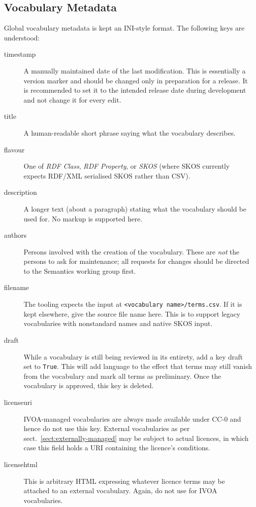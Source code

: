 \documentclass[11pt,a4paper]{ivoa}
\def\vocterm#1{\emph{\color{termcolor}#1}}
\def\vocterm{\startvocterm\realvocterm}
\def\realvocterm#1{\emph{\color{termcolor}#1}\endvocterm}
\gdef\breakablecolon{:\hskip0pt}
\gdef\startvocterm{\begingroup
  \catcode`\:=\active\let:=\breakablecolon}
\gdef\endvocterm{\endgroup}
\begin{document}

\subsection{Vocabulary Metadata}
\label{sect:vocmeta}

Global vocabulary metadata is kept an INI-style format.  The following
keys are understood:

\begin{description}
\item[timestamp]
  A manually maintained date of the last modification.  This is
  essentially a version marker and should be changed only in preparation
  for a release.  It is recommended to set it to the intended release
  date during development and not change it for every edit.
\item[title]
  A human-readable short phrase saying what the vocabulary describes.
\item[flavour]
  One of \textit{RDF Class}, \textit{RDF Property}, or \textit{SKOS}
  (where SKOS currently expects RDF/XML serialised SKOS rather than CSV).
\item[description]
  A longer text (about a paragraph) stating what the vocabulary should
  be used for.  No markup is supported here.
\item[authors]
  Persons involved with the creation of the vocabulary.  These are \emph{not}
  the persons to ask for maintenance; all requests for changes should be
  directed to the Semantics working group first.
\item[filename]
  The tooling expects the input at
  \verb|<vocabulary name>/terms.csv|.  If it is kept elsewhere, give
  the source file name here.  This is to support legacy
  vocabularies with nonstandard names and native SKOS input.
\item[draft]
  While a vocabulary is still being reviewed in its entirety, add a key
  draft set to \texttt{True}.  This will add language to the effect that
  terms may still vanish from the vocabulary and mark all terms as
  preliminary.  Once the vocabulary is approved, this key is deleted.
\item[licenseuri]
  IVOA-managed vocabularies are always made available under CC-0 and
  hence do not use this key.  External vocabularies as per
  sect.~\ref{sect:externally-managed} may be subject to actual licences,
  in which case this field holds a URI containing the licence's
  conditions.
\item[licensehtml]
  This is arbitrary HTML expressing whatever licence terms may be
  attached to an external vocabulary.  Again, do not use for IVOA
  vocabularies.
\end{description}
\end{document}
